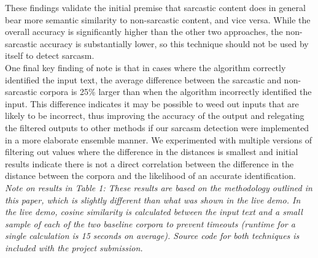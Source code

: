 \documentclass[conference]{IEEEtran}
\begin{document}
These findings validate the initial premise that sarcastic content does in general bear more semantic similarity to non-sarcastic content, and vice versa.  While the overall accuracy is significantly higher than the other two approaches, the non-sarcastic accuracy is substantially lower, so this technique should not be used by itself to detect sarcasm. \\
One final key finding of note is that in cases where the algorithm correctly identified the input text, the average difference between the sarcastic and non-sarcastic corpora is 25\% larger than when the algorithm incorrectly identified the input.  This difference indicates it may be possible to weed out inputs that are likely to be incorrect, thus improving the accuracy of the output and relegating the filtered outputs to other methods if our sarcasm detection were implemented in a more elaborate ensemble manner.  We experimented with multiple versions of filtering out values where the difference in the distances is smallest and initial results indicate there is not a direct correlation between the difference in the distance between the corpora and the likelihood of an accurate identification.\\
\newline
\emph{Note on results in Table 1: These results are based on the methodology outlined in this paper, which is slightly different than what was shown in the live demo.  In the live demo, cosine similarity is calculated between the input text and a small sample of each of the two baseline corpora to prevent timeouts (runtime for a single calculation is 15 seconds on average).  Source code for both techniques is included with the project submission.  }
\end{document}

